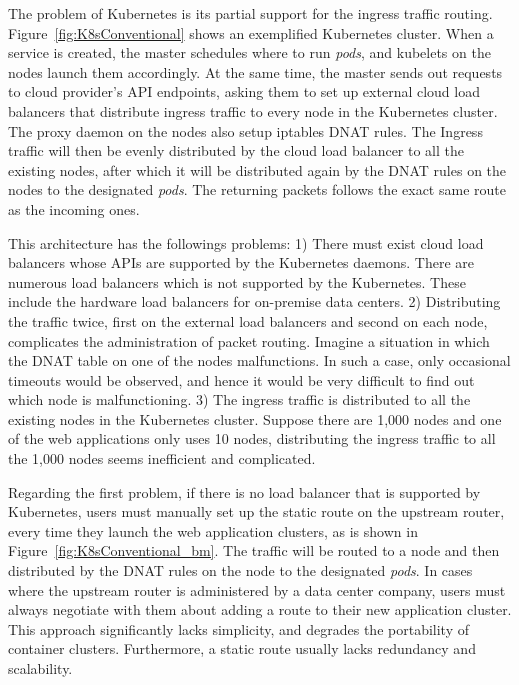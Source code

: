 The problem of Kubernetes is its partial support for the ingress traffic routing.
Figure~\ref{fig:K8sConventional} shows an exemplified Kubernetes cluster.
When a service is created, the master schedules where to run {\em pods}, and kubelets on the nodes launch them accordingly.
At the same time, the master sends out requests to cloud provider's API endpoints, asking them to set up external cloud load balancers that distribute ingress traffic to every node in the Kubernetes cluster.
The proxy daemon on the nodes also setup iptables DNAT\cite{MartinA.Brown2017} rules. 
The Ingress traffic will then be evenly distributed by the cloud load balancer to all the existing nodes, 
after which it will be distributed again by the DNAT rules on the nodes to the designated {\em pods}. 
The returning packets follows the exact same route as the incoming ones.

This architecture has the followings problems: 
1) There must exist cloud load balancers whose APIs are supported by the Kubernetes daemons.
There are numerous load balancers which is not supported by the Kubernetes.
These include the hardware load balancers for on-premise data centers.
2) Distributing the traffic twice, first on the external load balancers and second on each node, complicates the administration of packet routing. 
Imagine a situation in which the DNAT table on one of the nodes malfunctions.
In such a case, only occasional timeouts would be observed, and hence it would be very difficult to find out which node is malfunctioning.   
3) The ingress traffic is distributed to all the existing nodes in the Kubernetes cluster. 
Suppose there are 1,000 nodes and one of the web applications only uses 10 nodes, distributing the ingress traffic to all the 1,000 nodes seems inefficient and complicated.

Regarding the first problem, if there is no load balancer that is supported by Kubernetes, users must manually set up the static route on the upstream router, every time they launch the web application clusters, as is shown in Figure~\ref{fig:K8sConventional_bm}.
The traffic will be routed to a node and then distributed by the DNAT rules on the node to the designated {\em pods}.
In cases where the upstream router is administered by a data center company, users must always negotiate with them about adding a route to their new application cluster.
This approach significantly lacks simplicity, and degrades the portability of container clusters.
Furthermore, a static route usually lacks redundancy and scalability.

